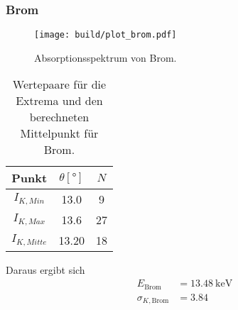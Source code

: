 \clearpage
\subsubsection*{Brom}
\begin{figure}[H]
    \centering
    \texttt{[image: build/plot\_brom.pdf]}
    \caption{Absorptionsspektrum von Brom.}
    \label{fig:brom}
\end{figure}
\begin{table}[H]                                                                                   
    \centering                                                                                     
        \caption{Wertepaare für die Extrema und den berechneten Mittelpunkt für Brom.}                      
        \label{tab:Br}                                                                        
        \begin{tabular}{S S[table-format=2.2] S}                                                   
          \toprule                                                                                 
          {Punkt} & {$\theta [\si{\degree}]$} & {$N$}\\                                            
          \midrule                                                                                 
          {$I_{K,Min  }$} &13.0&9\\
          {$I_{K,Max  }$} &13.6&27\\
          {$I_{K,Mitte}$} &13.20&18\\
          \bottomrule                                                                              
        \end{tabular}                                                                              
      \end{table}                                                                                  
Daraus ergibt sich                                                                                 
\begin{align*}                                                                                     
    E_\text{Brom} &= \SI{13.48}{\kilo\electronvolt}\\                  
    \sigma_{K, \text{Brom}} &= \num{3.84}                      
\end{align*}                                                                                       

